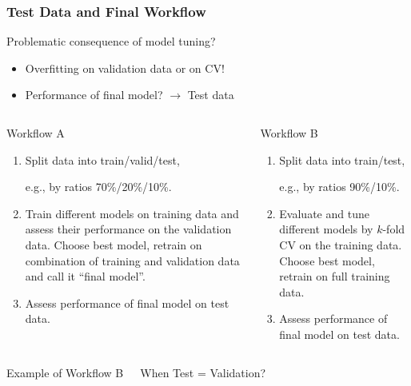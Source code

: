 \documentclass[
    utf8,
    aspectratio=169
]{beamer}  %
\begin{document}
\begin{frame}
	\frametitle{Test Data and Final Workflow}
	
	\begin{block}{Problematic consequence of model tuning?}
		\begin{itemize}
			\item \alert{Overfitting} on validation data or on CV!
			\item Performance of final model? $\rightarrow$ \alert{Test data}
		\end{itemize}
	\end{block}
	
	\begin{columns}[onlytextwidth]
		\begin{block}{Workflow A}
			\begin{footnotesize}
				\begin{enumerate}
					\item Split data into train/valid/test, 
					
					e.g., by ratios 70\%/20\%/10\%.
					\item Train different models on training data and assess their performance on the validation data. Choose best model, retrain on combination of training and validation data and call it ``final model''.
					\item Assess performance of final model on test data.
				\end{enumerate}
			\end{footnotesize}
		\end{block}
		
		\begin{block}{Workflow B}
			\begin{footnotesize}
				\begin{enumerate}
					\item Split data into train/test, 
					
					e.g., by ratios 90\%/10\%.
					\item Evaluate and tune different models by $k$-fold CV on the training data. Choose best model, retrain on full training data.
					\item Assess performance of final model on test data.
				\end{enumerate}
			\end{footnotesize}
		\end{block}
	\end{columns}

	\begin{columns}
		\begin{exampleblock}{Example of Workflow B}
		\end{exampleblock}
	
		\alert{When Test = Validation?}
	\end{columns}
\end{frame}
\end{document}
